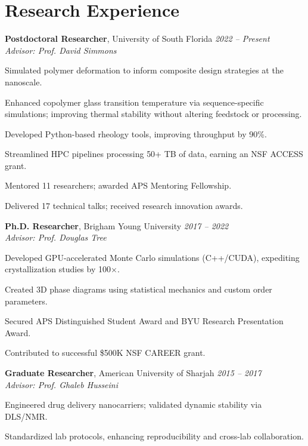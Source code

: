 \section*{Research Experience}
\textbf{Postdoctoral Researcher}, University of South Florida \hfill \textit{2022 – Present} \\
\textit{Advisor: Prof. David Simmons}
\begin{tabitemize}[leftmargin=*]
  \item Simulated polymer deformation to inform composite design strategies at the nanoscale.
  \item Enhanced copolymer glass transition temperature via sequence-specific simulations; improving thermal stability without altering feedstock or processing.
  \item Developed Python-based rheology tools, improving throughput by 90\%.
  \item Streamlined HPC pipelines processing 50+ TB of data, earning an NSF ACCESS grant.
  \item Mentored 11 researchers; awarded APS Mentoring Fellowship.
  \item Delivered 17 technical talks; received research innovation awards.
\end{tabitemize}
\textbf{Ph.D. Researcher}, Brigham Young University \hfill \textit{2017 – 2022} \\
\textit{Advisor: Prof. Douglas Tree}
\begin{tabitemize}[leftmargin=*]
  \item Developed GPU-accelerated Monte Carlo simulations (C++/CUDA), expediting crystallization studies by 100$\times$.
  \item Created 3D phase diagrams using statistical mechanics and custom order parameters.
  \item Secured APS Distinguished Student Award and BYU Research Presentation Award.
  \item Contributed to successful \$500K NSF CAREER grant.
\end{tabitemize}
\textbf{Graduate Researcher}, American University of Sharjah \hfill \textit{2015 – 2017} \\
\textit{Advisor: Prof. Ghaleb Husseini}
\begin{tabitemize}[leftmargin=*]
  \item Engineered drug delivery nanocarriers; validated dynamic stability via DLS/NMR.
  \item Standardized lab protocols, enhancing reproducibility and cross-lab collaboration.
\end{tabitemize}
\vspace{-0.6\baselineskip}
